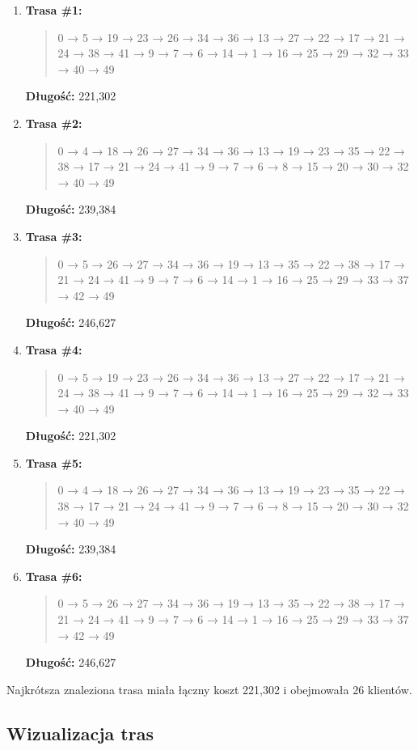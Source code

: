 \documentclass{article}
\begin{document}
\begin{enumerate}
    \item \textbf{Trasa \#1:}
    \begin{quote}
        0 → 5 → 19 → 23 → 26 → 34 → 36 → 13 → 27 → 22 → 17 → 21 → 24 → 38 → 41 → 9 → 7 → 6 → 14 → 1 → 16 → 25 → 29 → 32 → 33 → 40 → 49
    \end{quote}
    \textbf{Długość:} 221{,}302

    \item \textbf{Trasa \#2:}
    \begin{quote}
        0 → 4 → 18 → 26 → 27 → 34 → 36 → 13 → 19 → 23 → 35 → 22 → 38 → 17 → 21 → 24 → 41 → 9 → 7 → 6 → 8 → 15 → 20 → 30 → 32 → 40 → 49
    \end{quote}
    \textbf{Długość:} 239{,}384

    \item \textbf{Trasa \#3:}
    \begin{quote}
        0 → 5 → 26 → 27 → 34 → 36 → 19 → 13 → 35 → 22 → 38 → 17 → 21 → 24 → 41 → 9 → 7 → 6 → 14 → 1 → 16 → 25 → 29 → 33 → 37 → 42 → 49
    \end{quote}
    \textbf{Długość:} 246{,}627
     \item \textbf{Trasa \#4:}
    \begin{quote}
        0 → 5 → 19 → 23 → 26 → 34 → 36 → 13 → 27 → 22 → 17 → 21 → 24 → 38 → 41 → 9 → 7 → 6 → 14 → 1 → 16 → 25 → 29 → 32 → 33 → 40 → 49
    \end{quote}
    \textbf{Długość:} 221{,}302

    \item \textbf{Trasa \#5:}
    \begin{quote}
        0 → 4 → 18 → 26 → 27 → 34 → 36 → 13 → 19 → 23 → 35 → 22 → 38 → 17 → 21 → 24 → 41 → 9 → 7 → 6 → 8 → 15 → 20 → 30 → 32 → 40 → 49
    \end{quote}
    \textbf{Długość:} 239{,}384

    \item \textbf{Trasa \#6:}
    \begin{quote}
        0 → 5 → 26 → 27 → 34 → 36 → 19 → 13 → 35 → 22 → 38 → 17 → 21 → 24 → 41 → 9 → 7 → 6 → 14 → 1 → 16 → 25 → 29 → 33 → 37 → 42 → 49
    \end{quote}
    \textbf{Długość:} 246{,}627
\end{enumerate}

Najkrótsza znaleziona trasa miała łączny koszt 221{,}302 i obejmowała 26 klientów.

\subsection*{Wizualizacja tras}
\end{document}
